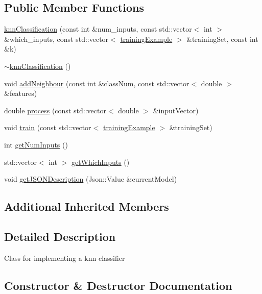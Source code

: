 \subsection*{Public Member Functions}
\begin{DoxyCompactItemize}
\item 
\hyperlink{classknn_classification_a37873bbb03dea575d878b0205a4d1b39}{knn\+Classification} (const int \&num\+\_\+inputs, const std\+::vector$<$ int $>$ \&which\+\_\+inputs, const std\+::vector$<$ \hyperlink{structtraining_example}{training\+Example} $>$ \&training\+Set, const int \&k)
\item 
\hyperlink{classknn_classification_a37e034151bb6d69c3952454df630dd80}{$\sim$knn\+Classification} ()
\item 
void \hyperlink{classknn_classification_aa6b10f1d20066e81e93c8172b4a7e44d}{add\+Neighbour} (const int \&class\+Num, const std\+::vector$<$ double $>$ \&features)
\item 
double \hyperlink{classknn_classification_aedeef4367ed652c768eaf5682c8ec276}{process} (const std\+::vector$<$ double $>$ \&input\+Vector)
\item 
void \hyperlink{classknn_classification_a04ce32741a132d39839d33d0d79e6c8f}{train} (const std\+::vector$<$ \hyperlink{structtraining_example}{training\+Example} $>$ \&training\+Set)
\item 
int \hyperlink{classknn_classification_a3f9c8fb78c6a66f0ab9440629140400d}{get\+Num\+Inputs} ()
\item 
std\+::vector$<$ int $>$ \hyperlink{classknn_classification_af7db9297f695e67df6af08719da37921}{get\+Which\+Inputs} ()
\item 
void \hyperlink{classknn_classification_a456b4b1b0fedb8f8fbe6d810bd80ceb8}{get\+J\+S\+O\+N\+Description} (Json\+::\+Value \&current\+Model)
\end{DoxyCompactItemize}
\subsection*{Additional Inherited Members}


\subsection{Detailed Description}
Class for implementing a knn classifier 

\subsection{Constructor \& Destructor Documentation}
\mbox{\label{classknn_classification_a37873bbb03dea575d878b0205a4d1b39}} 
